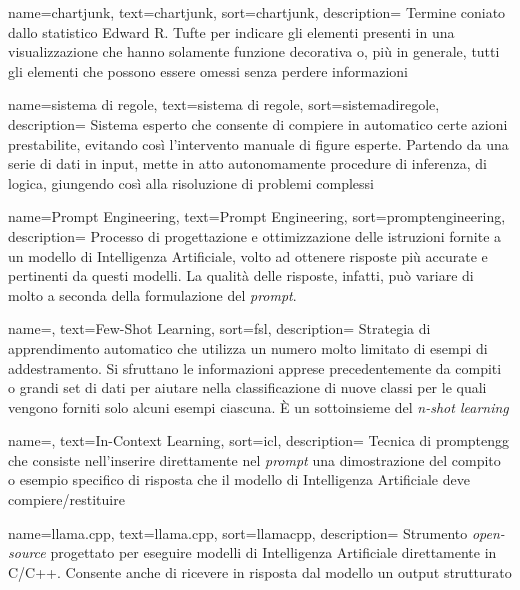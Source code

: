  {
    name=chartjunk,
    text=chartjunk,
    sort=chartjunk,
    description=
    {Termine coniato dallo statistico Edward R. Tufte per indicare gli elementi presenti in una visualizzazione che hanno solamente funzione decorativa o, più in generale, tutti gli elementi 
    che possono essere omessi senza perdere informazioni}
}

 {
    name=sistema di regole,
    text=sistema di regole,
    sort=sistemadiregole,
    description=
    {Sistema esperto che consente di compiere in automatico certe azioni prestabilite, evitando così l'intervento manuale di figure esperte.
    Partendo da una serie di dati in input, mette in atto autonomamente procedure di inferenza, di logica, giungendo così alla risoluzione di problemi complessi}
}

 {
    name=Prompt Engineering,
    text=Prompt Engineering,
    sort=promptengineering,
    description=
    {Processo di progettazione e ottimizzazione delle istruzioni fornite a un modello di Intelligenza Artificiale, volto ad ottenere risposte più accurate e pertinenti
    da questi modelli. La qualità delle risposte, infatti, può variare di molto a seconda della formulazione del \emph{prompt}.}
}

 {
    name=,
    text=Few-Shot Learning,
    sort=fsl,
    description=
    {Strategia di apprendimento automatico che utilizza un numero molto limitato di esempi di addestramento.
    Si sfruttano le informazioni apprese precedentemente da compiti o grandi set di dati per aiutare nella classificazione di nuove classi per le 
    quali vengono forniti solo alcuni esempi ciascuna.
    È un sottoinsieme del \emph{n-shot learning}}
}

 {
    name=,
    text=In-Context Learning,
    sort=icl,
    description=
    {Tecnica di \gls{promptengg} che consiste nell'inserire direttamente nel \emph{prompt} una dimostrazione del compito o esempio specifico di risposta che il modello 
    di Intelligenza Artificiale deve compiere/restituire}
}

 {
    name=llama.cpp,
    text=llama.cpp,
    sort=llamacpp,
    description=
    {Strumento \emph{open-source} progettato per eseguire modelli di Intelligenza Artificiale direttamente in C/C++.
    Consente anche di ricevere in risposta dal modello un output strutturato}
}

